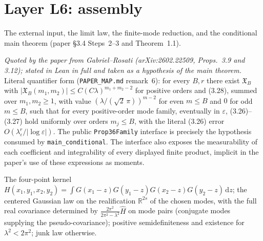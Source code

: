 \chapter{Layer L6: assembly}\label{ch:main}

The external input, the limit law, the finite-mode reduction, and the
conditional main theorem (paper \S3.4 Steps~2--3 and Theorem~1.1).

\begin{proposition}\label{P-3.6}
  \leanok
  \emph{Quoted by the paper from Gabriel--Rosati (arXiv:2602.22509,
  Props.~3.9 and 3.12); stated in Lean in full and taken as a hypothesis
  of the main theorem.}
  Literal quantifier form (\texttt{PAPER\_MAP.md} remark~6): for every
  \(B, r\) there exist \(\mathfrak{X}_B\) with
  \(\lvert\mathfrak{X}_B(m_1,m_2)\rvert \le C(C\lambda)^{m_1+m_2-2}\)
  for positive orders and (3.28), summed over \(m_1,m_2\ge1\), with
  value \((\lambda/(\sqrt{2}\,\pi))^{m-2}\) for even \(m\le B\) and \(0\)
  for odd \(m\le B\), such that for every positive-order mode family,
  eventually in \(\varepsilon\), (3.26)--(3.27) hold uniformly over orders
  \(m_j \le B\), with the literal (3.26) error
  \(O(\lambda_\varepsilon^r/\lvert\log\varepsilon\rvert)\).  The public
  \texttt{Prop36Family} interface is precisely the hypothesis
  consumed by \texttt{main\_conditional}.  The interface also exposes the measurability of each coefficient and
  integrability of every displayed finite product, implicit in the
  paper's use of these expressions as moments.
\end{proposition}

\begin{definition}\label{D-limit}
  \leanok
  The four-point kernel
  \(H(x_1,y_1,x_2,y_2) = \int G(x_1-z)G(y_1-z)G(x_2-z)G(y_2-z)\,
  \mathrm{d}z\); the centered Gaussian law on the realification
  \(\mathbb{R}^{2s}\) of the chosen modes, with the full real covariance
  determined by \(\frac{2\pi^2}{2\pi^2-\lambda^2}\widehat H\) on mode
  pairs (conjugate modes supplying the pseudo-covariance); positive
  semidefiniteness and existence for \(\lambda^2 < 2\pi^2\); junk law
  otherwise.
\end{definition}

